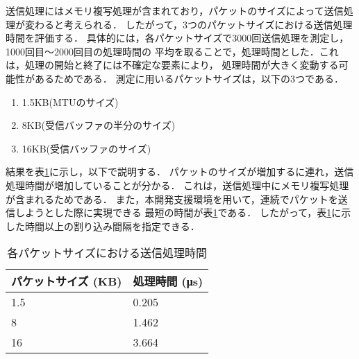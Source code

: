\documentclass[submit,techreq,noauthor,dvipdfmx]{ipsj}
\begin{document}
送信処理にはメモリ複写処理が含まれており，パケットのサイズによって送信処理が変わると考えられる．
したがって，3つのパケットサイズにおける送信処理時間を評価する．
具体的には，各パケットサイズで3000回送信処理を測定し，1000回目〜2000回目の処理時間の
平均を取ることで，処理時間とした．これは，処理の開始と終了には不確定な要素により，
処理時間が大きく変動する可能性があるためである．
測定に用いるパケットサイズは，以下の3つである．
\begin{enumerate}
    \item 1.5KB(MTUのサイズ)
    \item 8KB(受信バッファの半分のサイズ)
    \item 16KB(受信バッファのサイズ)
\end{enumerate}

結果を表\ref{tx-time}に示し，以下で説明する．
パケットのサイズが増加するに連れ，送信処理時間が増加していることが分かる．
これは，送信処理中にメモリ複写処理が含まれるためである．
また，本開発支援環境を用いて，連続でパケットを送信しようとした際に実現できる
最短の時間が表\ref{tx-time}である．
したがって，表\ref{tx-time}に示した時間以上の割り込み間隔を指定できる．


\begin{table}[h]
    \caption{各パケットサイズにおける送信処理時間}
    \label{tx-time}
    \begin{center}
        \begin{tabular}{l|l}   \hline \hline 
            パケットサイズ (KB)      & 処理時間 (μs)    \\ \hline
            1.5                      & 0.205            \\
            8                        & 1.462            \\
            16                       & 3.664            \\ \hline
        \end{tabular}
    \end{center}
\end{table}
\end{document}
